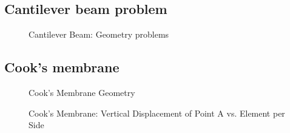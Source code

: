 \documentclass[a4paper,11pt]{article}
\begin{document}
\subsection{Cantilever beam problem}

\begin{figure}[!h]
\begin{center}

\caption{Cantilever Beam: Geometry problems \label{fig:beam}}
\end{center}
\end{figure}


\subsection{Cook's membrane}

\begin{figure}[!h]
\begin{center}

\caption{Cook's Membrane Geometry \label{fig:cook_membrane}}
\end{center}
\end{figure}
%
\begin{figure}[!h]
\begin{center}
\caption{Cook's Membrane: Vertical Displacement of Point A vs. Element per Side}
\end{center}
\end{figure}
\end{document}
